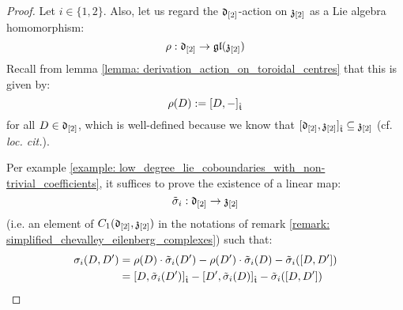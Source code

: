             \begin{proof}
                Let $i \in \{1, 2\}$. Also, let us regard the $\mathfrak{d}_{[2]}$-action on $\mathfrak{z}_{[2]}$ as a Lie algebra homomorphism:
                    $$\rho: \mathfrak{d}_{[2]} \to \mathfrak{gl}( \mathfrak{z}_{[2]} )$$
                Recall from lemma \ref{lemma: derivation_action_on_toroidal_centres} that this is given by:
                    $$\rho(D) := [D, -]_{\hat{\mathfrak{t}}}$$
                for all $D \in \mathfrak{d}_{[2]}$, which is well-defined because we know that $[\mathfrak{d}_{[2]}, \mathfrak{z}_{[2]}]_{\hat{\mathfrak{t}}} \subseteq \mathfrak{z}_{[2]}$ (cf. \textit{loc. cit.}).
            
                Per example \ref{example: low_degree_lie_coboundaries_with_non-trivial_coefficients}, it suffices to prove the existence of a linear map:
                    $$\tilde{\sigma}_i: \mathfrak{d}_{[2]} \to \mathfrak{z}_{[2]}$$
                (i.e. an element of $C_1(\mathfrak{d}_{[2]}, \mathfrak{z}_{[2]})$ in the notations of remark \ref{remark: simplified_chevalley_eilenberg_complexes}) such that:
                    $$
                        \begin{aligned}
                            \sigma_i(D, D') & = \rho(D) \cdot \tilde{\sigma}_i(D') - \rho(D') \cdot \tilde{\sigma}_i(D) - \tilde{\sigma}_i([D, D'])
                            \\
                            & = [D, \tilde{\sigma}_i(D')]_{\hat{\mathfrak{t}}} - [D', \tilde{\sigma}_i(D)]_{\hat{\mathfrak{t}}} - \tilde{\sigma}_i([D, D'])
                        \end{aligned}
                    $$
                    

\end{proof}
